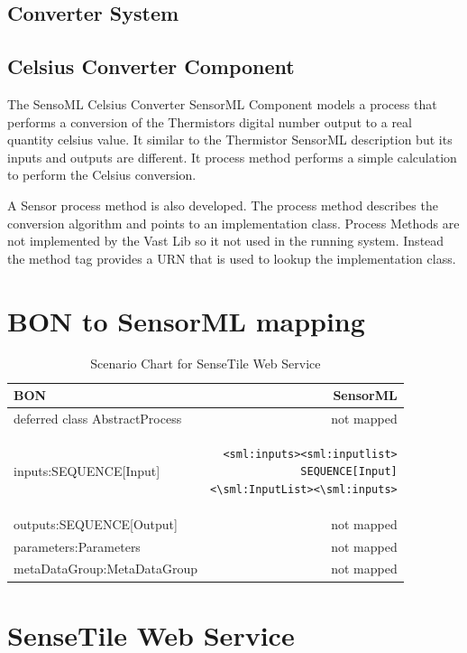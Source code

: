 \documentclass[]{final_report}
\begin{document}
\subsection{Converter System}
\subsection{Celsius Converter Component}

The SensoML Celsius Converter SensorML Component  models a process that performs a conversion of the Thermistors digital number output to a real quantity celsius value. It similar to the Thermistor SensorML description but its inputs and outputs are different. It process method performs a simple calculation to perform the Celsius conversion.

A Sensor process method is also developed. The process method describes the conversion algorithm and points to an implementation class. Process Methods are not implemented by the Vast Lib so it not used in the running system. Instead the method tag provides a URN that is used to lookup the implementation class.

\section{BON to SensorML mapping}
\lstset{frame=none}
\begin{table}[!th]
\begin{tabular}{|l|r|}
\hline
BON & SensorML\\
\hline
   deferred class AbstractProcess  & not mapped\\
\hline     
     inputs:SEQUENCE[Input] & \begin{lstlisting}
<sml:inputs><sml:inputlist>
SEQUENCE[Input]
<\sml:InputList><\sml:inputs>\end{lstlisting}\\

\hline 
     outputs:SEQUENCE[Output] & not mapped\\
\hline
     parameters:Parameters & not mapped\\

\hline                 
     metaDataGroup:MetaDataGroup & not mapped\\
 \hline    

\end{tabular}
\caption{Scenario Chart for SenseTile Web Service}
\label{ex:table}
\end{table}

\section{SenseTile Web Service}
\end{document}
